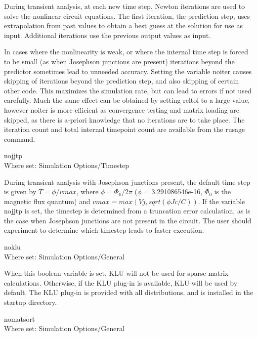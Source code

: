 \begin{description}
During transient analysis, at each new time step, Newton iterations
are used to solve the nonlinear circuit equations.  The first
iteration, the prediction step, uses extrapolation from past values to
obtain a best guess at the solution for use as input.  Additional
iterations use the previous output values as input.

In cases where the nonlinearity is weak, or where the internal time
step is forced to be small (as when Josephson junctions are present)
iterations beyond the predictor sometimes lead to unneeded accuracy. 
Setting the variable {\et noiter} causes skipping of iterations beyond
the prediction step, and also skipping of certain other code.  This
maximizes the simulation rate, but can lead to errors if not used
carefully.  Much the same effect can be obtained by setting {\et
reltol} to a large value, however {\et noiter} is more efficient as
convergence testing and matrix loading are skipped, as there is
a-priori knowledge that no iterations are to take place.  The
iteration count and total internal timepoint count are available from
the {\cb rusage} command.

\item{\et nojjtp}\\
Where set: {\cb Simulation Options/Timestep}

During transient analysis with Josephson junctions present, the
default time step is given by $T = \phi/vmax$, where $\phi =
\Phi_0/2\pi$ ($\phi$ = 3.291086546e-16, $\Phi_0$ is the magnetic
flux quantum) and $vmax = max(Vj, sqrt({\phi}Jc/C))$.  If the
variable {\et nojjtp} is set, the timestep is determined from a
truncation error calculation, as is the case when Josephson
junctions are not present in the circuit.  The user should
experiment to determine which timestep leads to faster execution.

\item{\et noklu}\\
Where set: {\cb Simulation Options/General}

When this boolean variable is set, KLU will not be used for sparse
matrix calculations.  Otherwise, if the KLU plug-in is available, KLU
will be used by default.  The KLU plug-in is provided with all
{\WRspice} distributions, and is installed in the startup directory.

\item{\et nomatsort}\\
Where set: {\cb Simulation Options/General}


\end{description}

